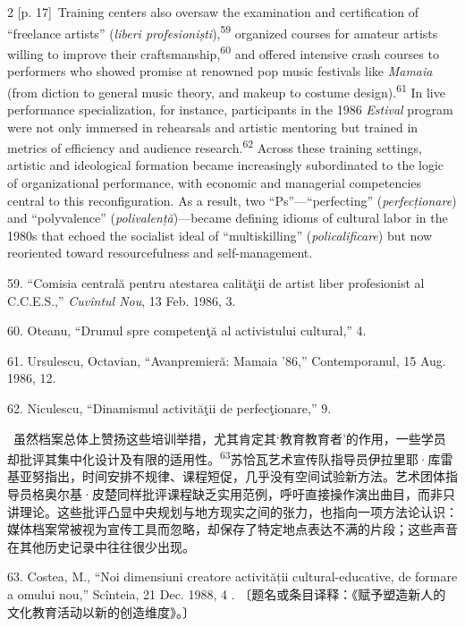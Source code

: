 \documentclass[10pt,a4paper]{article}
\begin{document}
\begin{paracol}{2}
{\scriptsize\color{gray} [p. 17]}\ Training centers also oversaw the examination and certification of “freelance artists” (\textit{liberi profesioniști}),\nobreak\textsuperscript{59} organized courses for amateur artists willing to improve their craftsmanship,\nobreak\textsuperscript{60} and offered intensive crash courses to performers who showed promise at renowned pop music festivals like \textit{Mamaia} (from diction to general music theory, and makeup to costume design).\nobreak\textsuperscript{61} In live performance specialization, for instance, participants in the 1986 \textit{Estival} program were not only immersed in rehearsals and artistic mentoring but trained in metrics of efficiency and audience research.\nobreak\textsuperscript{62} Across these training settings, artistic and ideological formation became increasingly subordinated to the logic of organizational performance, with economic and managerial competencies central to this reconfiguration. As a result, two “Ps”—“perfecting” (\textit{perfecționare}) and “polyvalence” (\textit{polivalență})—became defining idioms of cultural labor in the 1980s that echoed the socialist ideal of “multiskilling” (\textit{policalificare}) but now reoriented toward resourcefulness and self-management.\par{\small 59. “Comisia centrală pentru atestarea calităţii de artist liber profesionist al C.C.E.S.,” \textit{Cuvîntul Nou}, 13 Feb. 1986, 3.\par}{\small 60. Oteanu, “Drumul spre competenţă al activistului cultural,” 4.\par}{\small 61. Ursulescu, Octavian, “Avanpremieră: Mamaia ’86,” Contemporanul, 15 Aug. 1986, 12.\par}{\small 62. Niculescu, “Dinamismul activităţii de perfecţionare,” 9.\par}
\switchcolumn*
{\scriptsize\color{gray} [p. 17]}\ 虽然档案总体上赞扬这些培训举措，尤其肯定其‘教育教育者’的作用，一些学员却批评其集中化设计及有限的适用\mbox{性。\textsuperscript{63}}苏恰瓦艺术宣传队指导员伊拉里耶·库雷基亚努指出，时间安排不规律、课程短促，几乎没有空间试验新方法。艺术团体指导员格奥尔基·皮楚同样批评课程缺乏实用范例，呼吁直接操作演出曲目，而非只讲理论。这些批评凸显中央规划与地方现实之间的张力，也指向一项方法论认识：媒体档案常被视为宣传工具而忽略，却保存了特定地点表达不满的片段；这些声音在其他历史记录中往往很少出现。\par{\small 63. Costea, M., “Noi dimensiuni creatore activității cultural-educative, de formare a omului nou,” Scînteia, 21 Dec. 1988, 4 . 〔题名或条目译释：《赋予塑造新人的文化教育活动以新的创造维度》。〕\par}

\end{paracol}
\end{document}
